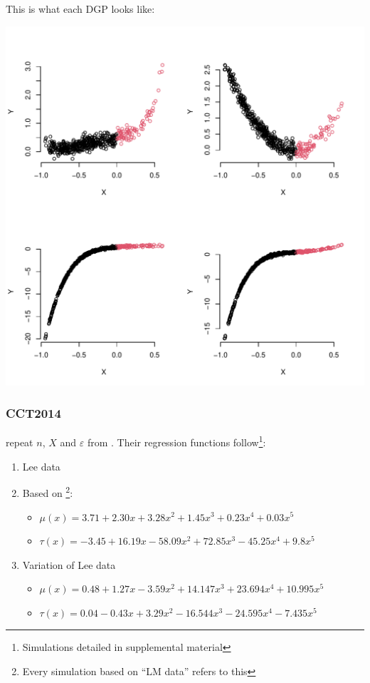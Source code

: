 \documentclass[11pt]{article}
\begin{document}
This is what each DGP looks like:

\begin{center}
\includegraphics[width=.9\linewidth]{IK2012.pdf}
\end{center}

\subsubsection{CCT2014}
\label{sec:org9a19808}
\cite{calonico2014robust} repeat \(n\), \(X\) and \(\varepsilon\)
from \cite{imbens2012optimal}. Their regression functions
follow\footnote{Simulations detailed in supplemental material}:

\begin{enumerate}
\item Lee data
\item Based on \cite{ludwig2007does}\footnote{Every simulation based on ``LM data'' refers to this}:
\begin{itemize}
\item \(\mu(x) = 3.71 + 2.30 x + 3.28 x^2 + 1.45 x^3 + 0.23
     x^4 + 0.03 x^5\)
\item \(\tau(x) = -3.45 + 16.19 x - 58.09 x^2 + 72.85 x^3 -
     45.25 x^4 + 9.8 x^5\)
\end{itemize}
\item Variation of Lee data
\begin{itemize}
\item \(\mu(x) = 0.48 + 1.27 x - 3.59 x^2 + 14.147 x^3 +
     23.694 x^4 + 10.995 x^5\)
\item \(\tau(x) = 0.04 - 0.43 x + 3.29 x^2 - 16.544 x^3 -
     24.595 x^4 - 7.435 x^5\)
\end{itemize}
\end{enumerate}
\end{document}
